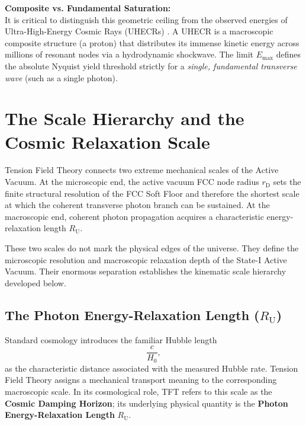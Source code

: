 \vspace{0.5em}
\noindent\textbf{Composite vs. Fundamental Saturation:}\\
It is critical to distinguish this geometric ceiling from the observed energies of Ultra-High-Energy Cosmic Rays (UHECRs) \cite{Bird_1995, PierreAuger_2014}. A UHECR is a macroscopic composite structure (a proton) that distributes its immense kinetic energy across millions of resonant nodes via a hydrodynamic shockwave. The limit $E_{\mathrm{max}}$ defines the absolute Nyquist yield threshold strictly for a \textit{single, fundamental transverse wave} (such as a single photon).

\section{The Scale Hierarchy and the Cosmic Relaxation Scale}
\label{sec:scale_hierarchy}

Tension Field Theory connects two extreme mechanical scales of the Active Vacuum. At the microscopic end, the active vacuum FCC node radius $r_{\mathrm D}$ sets the finite structural resolution of the FCC Soft Floor and therefore the shortest scale at which the coherent transverse photon branch can be sustained. At the macroscopic end, coherent photon propagation acquires a characteristic energy-relaxation length $R_{\mathrm U}$.

These two scales do not mark the physical edges of the universe. They define the microscopic resolution and macroscopic relaxation depth of the State-I Active Vacuum. Their enormous separation establishes the kinematic scale hierarchy developed below.


\subsection{The Photon Energy-Relaxation Length ($R_{\mathrm U}$)}
\label{sec:viscous_cosmic_horizon}

Standard cosmology introduces the familiar Hubble length
\begin{equation}
    \frac{c}{H_0},
\end{equation}
as the characteristic distance associated with the measured Hubble rate. Tension Field Theory assigns a mechanical transport meaning to the corresponding macroscopic scale. In its cosmological role, TFT refers to this scale as the \textbf{Cosmic Damping Horizon}; its underlying physical quantity is the \textbf{Photon Energy-Relaxation Length} $R_{\mathrm U}$.

